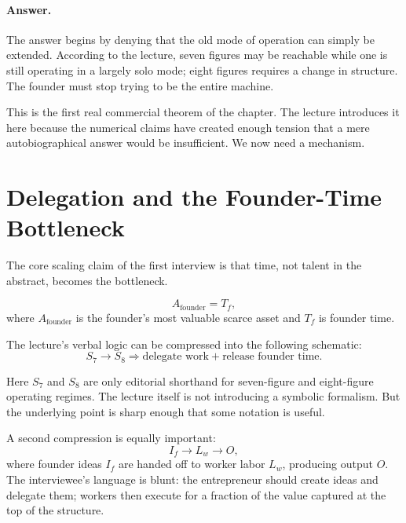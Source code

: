 \paragraph{Answer.}
The answer begins by denying that the old mode of operation can simply be extended. According to the lecture, seven figures may be reachable while one is still operating in a largely solo mode; eight figures requires a change in structure. The founder must stop trying to be the entire machine.

This is the first real commercial theorem of the chapter. The lecture introduces it here because the numerical claims have created enough tension that a mere autobiographical answer would be insufficient. We now need a mechanism.

\section{Delegation and the Founder-Time Bottleneck}

The core scaling claim of the first interview is that time, not talent in the abstract, becomes the bottleneck.

\begin{equation}
A_{\text{founder}} = T_f,
\end{equation}
where \(A_{\text{founder}}\) is the founder's most valuable scarce asset and \(T_f\) is founder time.

The lecture's verbal logic can be compressed into the following schematic:
\begin{equation}
S_7 \to S_8 \Rightarrow \text{delegate work} + \text{release founder time}.
\end{equation}

Here \(S_7\) and \(S_8\) are only editorial shorthand for seven-figure and eight-figure operating regimes. The lecture itself is not introducing a symbolic formalism. But the underlying point is sharp enough that some notation is useful.

A second compression is equally important:
\begin{equation}
I_f \to L_w \to O,
\end{equation}
where founder ideas \(I_f\) are handed off to worker labor \(L_w\), producing output \(O\). The interviewee's language is blunt: the entrepreneur should create ideas and delegate them; workers then execute for a fraction of the value captured at the top of the structure.

